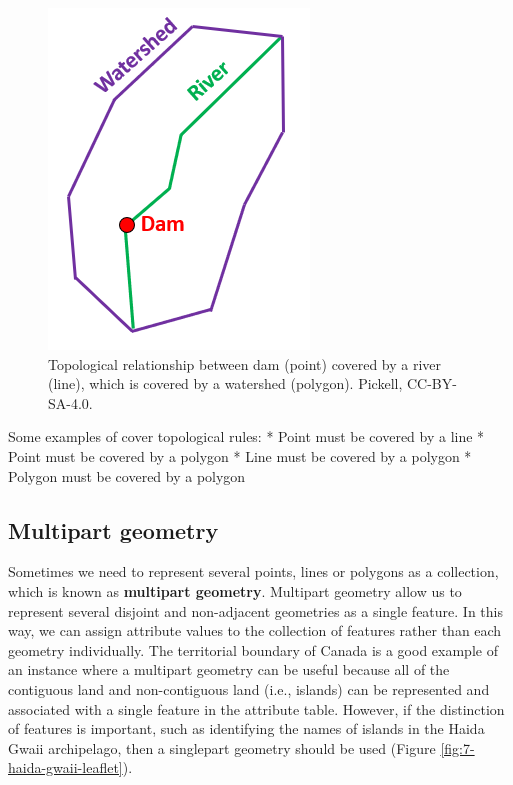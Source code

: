 \documentclass[
]{book}
\begin{document}
\begin{figure}
\includegraphics[width=0.75\linewidth]{images/07-dam-river-watershed} \caption{Topological relationship between dam (point) covered by a river (line), which is covered by a watershed (polygon). Pickell, CC-BY-SA-4.0.}\label{fig:7-dam-river-watershed}
\end{figure}

Some examples of cover topological rules:
* Point must be covered by a line
* Point must be covered by a polygon
* Line must be covered by a polygon
* Polygon must be covered by a polygon

\hypertarget{multipart-geometry}{%
\subsection{Multipart geometry}\label{multipart-geometry}}

Sometimes we need to represent several points, lines or polygons as a collection, which is known as \textbf{multipart geometry}. Multipart geometry allow us to represent several disjoint and non-adjacent geometries as a single feature. In this way, we can assign attribute values to the collection of features rather than each geometry individually. The territorial boundary of Canada is a good example of an instance where a multipart geometry can be useful because all of the contiguous land and non-contiguous land (i.e., islands) can be represented and associated with a single feature in the attribute table. However, if the distinction of features is important, such as identifying the names of islands in the Haida Gwaii archipelago, then a singlepart geometry should be used (Figure \ref{fig:7-haida-gwaii-leaflet}).
\end{document}
